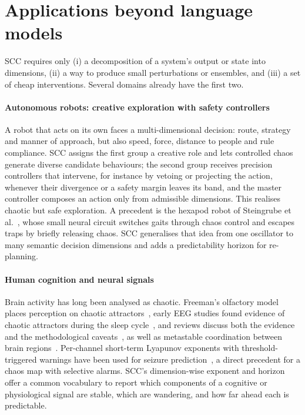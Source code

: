 \documentclass[preprint,12pt]{elsarticle}
\begin{document}
\section{Applications beyond language models}
\label{sec:applications}

SCC requires only (i) a decomposition of a system's output or state into dimensions, (ii) a way to produce small perturbations or ensembles, and (iii) a set of cheap interventions. Several domains already have the first two.

\paragraph{Autonomous robots: creative exploration with safety controllers}
A robot that acts on its own faces a multi-dimensional decision: route, strategy and manner of approach, but also speed, force, distance to people and rule compliance. SCC assigns the first group a creative role and lets controlled chaos generate diverse candidate behaviours; the second group receives precision controllers that intervene, for instance by vetoing or projecting the action, whenever their divergence or a safety margin leaves its band, and the master controller composes an action only from admissible dimensions. This realises chaotic but safe exploration. A precedent is the hexapod robot of Steingrube et al.~\cite{steingrube2010}, whose small neural circuit switches gaits through chaos control and escapes traps by briefly releasing chaos. SCC generalises that idea from one oscillator to many semantic decision dimensions and adds a predictability horizon for re-planning.

\paragraph{Human cognition and neural signals}
Brain activity has long been analysed as chaotic. Freeman's olfactory model places perception on chaotic attractors~\cite{skarda1987}, early EEG studies found evidence of chaotic attractors during the sleep cycle~\cite{babloyantz1985}, and reviews discuss both the evidence and the methodological caveats~\cite{korn2003,stam2005}, as well as metastable coordination between brain regions~\cite{tognoli2014}. Per-channel short-term Lyapunov exponents with threshold-triggered warnings have been used for seizure prediction~\cite{iasemidis2003}, a direct precedent for a chaos map with selective alarms. SCC's dimension-wise exponent and horizon offer a common vocabulary to report which components of a cognitive or physiological signal are stable, which are wandering, and how far ahead each is predictable.
\end{document}
